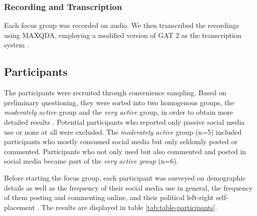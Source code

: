 \documentclass[runningheads]{llncs}
\begin{document}
\hypertarget{recording-and-transcription}{%
\subsubsection{Recording and Transcription}\label{recording-and-transcription}}

Each focus group was recorded on audio. We then transcribed the recordings using MAXQDA, employing a modified version of GAT 2 as the transcription system \autocite{seltingSystemTranscribingTalkininteraction2011}.

\hypertarget{participants}{%
\subsection{Participants}\label{participants}}

The participants were recruited through convenience sampling. Based on preliminary questioning, they were sorted into two homogenous groups, the \emph{moderately active} group and the \emph{very active} group, in order to obtain more detailed results \autocite{schulzFokusgruppenEmpirischenSozialwissenschaft2012}.
Potential participants who reported only passive social media use or none at all were excluded. The \emph{moderately active} group (n=5) included participants who mostly consumed social media but only seldomly posted or commented. Participants who not only used but also commented and posted in social media became part of the \emph{very active group} (n=6).

Before starting the focus group, each participant was surveyed on demographic details as well as the frequency of their social media use in general, the frequency of them posting and commenting online, and their political left-right self-placement \autocite{breyerLeftRightSelfPlacementALLBUS}. The results are displayed in table \ref{tab:table-participants}.
\end{document}
